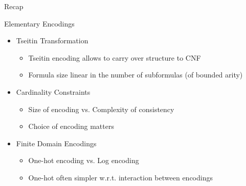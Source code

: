\documentclass[t]{sdqbeamer}
\begin{document}
\begin{frame}{Recap}

	\begin{block}{Elementary Encodings}
		\begin{itemize}\setlength{\itemsep}{1em}
			\item Tseitin Transformation
			\begin{itemize}\setlength{\itemsep}{1ex}
				\item Tseitin encoding allows to carry over structure to CNF
				\item Formula size linear in the number of subformulas (of bounded arity)
			\end{itemize}
			\item Cardinality Constraints
			\begin{itemize}\setlength{\itemsep}{1ex}
				\item Size of encoding vs. Complexity of consistency
				\item Choice of encoding matters
			\end{itemize}
			\item Finite Domain Encodings
			\begin{itemize}\setlength{\itemsep}{1ex}
				\item One-hot encoding vs. Log encoding
				\item One-hot often simpler w.r.t. interaction between encodings
			\end{itemize}
		\end{itemize}
	\end{block}
	
\end{frame}
\end{document}
